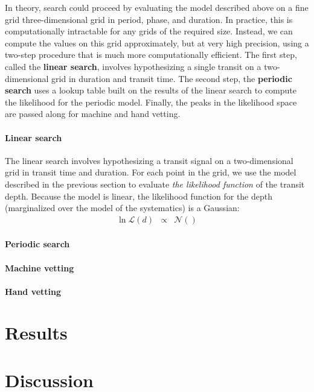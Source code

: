 \documentclass[12pt,preprint]{aastex}
\begin{document}
In theory, search could proceed by evaluating the model described above on a
fine grid three-dimensional grid in period, phase, and duration.
In practice, this is computationally intractable for any grids of the
required size.
Instead, we can compute the values on this grid approximately, but at very
high precision, using a two-step procedure that is much more computationally
efficient.
The first step, called the {\bf linear search}, involves hypothesizing a
single transit on a two-dimensional grid in duration and transit time.
The second step, the {\bf periodic search} uses a lookup table built on the
results of the linear search to compute the likelihood for the periodic model.
Finally, the peaks in the likelihood space are passed along for machine and
hand vetting.

\paragraph{Linear search}

The linear search involves hypothesizing a transit signal on a
two-dimensional grid in transit time and duration.
For each point in the grid, we use the model described in the previous
section to evaluate \emph{the likelihood function} of the transit depth.
Because the model is linear, the likelihood function for the depth
(marginalized over the model of the systematics) is a Gaussian:
\begin{eqnarray}
\ln \mathcal{L} (d) &\propto& \mathcal{N} ()
\end{eqnarray}

\paragraph{Periodic search}

\paragraph{Machine vetting}

\paragraph{Hand vetting}


\section{Results}

\section{Discussion}
\end{document}
